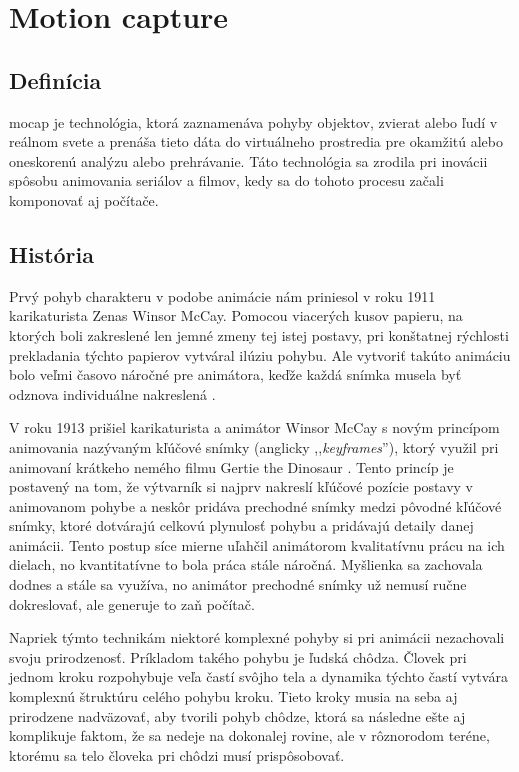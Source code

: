 \section{Motion capture} %
\subsection{Definícia}

\noindent\acrfull{mocap} je technológia, ktorá zaznamenáva pohyby objektov, zvierat alebo ľudí v reálnom svete a prenáša tieto dáta do virtuálneho prostredia pre okamžitú alebo oneskorenú analýzu alebo prehrávanie. Táto technológia sa zrodila pri inovácii spôsobu animovania seriálov a filmov, kedy sa do tohoto procesu začali komponovať aj počítače.

\subsection{História}

Prvý pohyb charakteru v podobe animácie nám priniesol v roku 1911 karikaturista Zenas Winsor McCay. Pomocou viacerých kusov papieru, na ktorých boli zakreslené len jemné zmeny tej istej postavy, pri konštatnej rýchlosti prekladania týchto papierov vytváral ilúziu pohybu. Ale vytvoriť takúto animáciu bolo veľmi časovo náročné pre animátora, keďže každá snímka musela byť odznova individuálne nakreslená \cite{mocapFundamentals}.

V roku 1913 prišiel karikaturista a animátor Winsor McCay s novým princípom animovania nazývaným kľúčové snímky (anglicky ,,\textit{keyframes}''), ktorý využil pri animovaní krátkeho nemého filmu Gertie the Dinosaur \cite{gertieDino}. Tento princíp je postavený na tom, že výtvarník si najprv nakreslí kľúčové pozície postavy v animovanom pohybe a neskôr pridáva prechodné snímky medzi pôvodné kľúčové snímky, ktoré dotvárajú celkovú plynulosť pohybu a pridávajú detaily danej animácii. Tento postup síce mierne uľahčil animátorom kvalitatívnu prácu na ich dielach, no kvantitatívne to bola práca stále náročná. Myšlienka sa zachovala dodnes a stále sa využíva, no animátor prechodné snímky už nemusí ručne dokreslovať, ale generuje to zaň počítač.  

Napriek týmto technikám niektoré komplexné pohyby si pri animácii nezachovali svoju prirodzenosť. Príkladom takého pohybu je ľudská chôdza. Človek pri jednom kroku rozpohybuje veľa častí svôjho tela a dynamika týchto častí vytvára komplexnú štruktúru celého pohybu kroku. Tieto kroky musia na seba aj prirodzene nadväzovať, aby tvorili pohyb chôdze, ktorá sa následne ešte aj komplikuje faktom, že sa nedeje na dokonalej rovine, ale v rôznorodom teréne, ktorému sa telo človeka pri chôdzi musí prispôsobovať.

